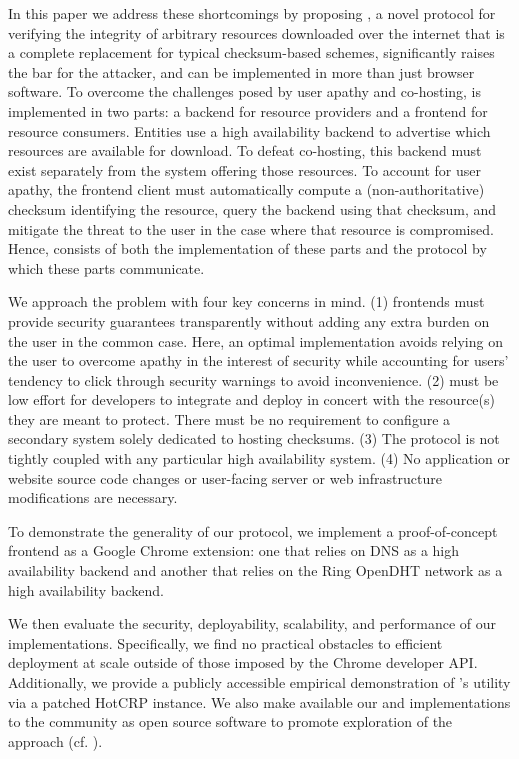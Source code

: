 In this paper we address these shortcomings by proposing \SYSTEM{}, a novel
protocol for verifying the integrity of arbitrary resources downloaded over the
internet that is a complete replacement for typical checksum-based schemes,
significantly raises the bar for the attacker, and can be implemented in more
than just browser software. To overcome the challenges posed by user apathy and
co-hosting, \SYSTEM{} is implemented in two parts: a backend for resource
providers and a frontend for resource consumers. Entities use a high
availability backend to advertise which resources are available for download. To
defeat co-hosting, this backend must exist separately from the system offering
those resources. To account for user apathy, the frontend client must
automatically compute a (non-authoritative) checksum identifying the resource,
query the backend using that checksum, and mitigate the threat to the user in
the case where that resource is compromised. Hence, \SYSTEM{} consists of both
the implementation of these parts and the protocol by which these parts
communicate.

We approach the problem with four key concerns in mind. (1) \SYSTEM{} frontends
must provide security guarantees transparently without adding any extra burden
on the user in the common case. Here, an optimal implementation avoids relying
on the user to overcome apathy in the interest of security while accounting for
users' tendency to click through security warnings to avoid inconvenience. (2)
\SYSTEM{} must be low effort for developers to integrate and deploy in concert
with the resource(s) they are meant to protect. There must be no requirement to
configure a secondary system solely dedicated to hosting checksums. (3) The
protocol is not tightly coupled with any particular high availability system.
(4) No application or website source code changes or user-facing server or web
infrastructure modifications are necessary.

To demonstrate the generality of our protocol, we implement a proof-of-concept
frontend as a Google Chrome extension: one that relies on DNS as a high
availability backend and another that relies on the Ring OpenDHT network as a
high availability backend.

We then evaluate the security, deployability, scalability, and performance of
our implementations. Specifically, we find no practical obstacles to efficient
deployment at scale outside of those imposed by the Chrome developer API.
Additionally, we provide a publicly accessible empirical demonstration of
\SYSTEM{}'s utility via a patched HotCRP instance. We also make available our
\DNSSYS{} and \DHTSYS{} implementations to the community as open source software
to promote exploration of the \SYSTEM{} approach (cf. ).

